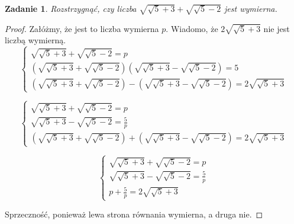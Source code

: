 \documentclass{article}
\newtheorem{problem}{Zadanie}
\begin{document}
\begin{problem}
    Rozstrzygnąć, czy liczba $\sqrt{\sqrt{5} + 3} + \sqrt{\sqrt{5} - 2}$
    jest wymierna.
\end{problem}
\begin{proof}
    Załóżmy, że jest to liczba wymierna $p$.
    Wiadomo, że $2 \sqrt{\sqrt{5} + 3}$ nie jest liczbą wymierną.
    $$
    \left\{ \begin{array}{ll}
        \sqrt{\sqrt{5} + 3} + \sqrt{\sqrt{5} - 2} = p\\
        (\sqrt{\sqrt{5} + 3} + \sqrt{\sqrt{5} - 2})(\sqrt{\sqrt{5} + 3}
         - \sqrt{\sqrt{5} - 2}) = 5\\
        (\sqrt{\sqrt{5} + 3} + \sqrt{\sqrt{5} - 2}) -
        (\sqrt{\sqrt{5} + 3} - \sqrt{\sqrt{5} - 2}) = 2 \sqrt{\sqrt{5} + 3}
    \end{array} \right.
    $$

    $$
    \left\{ \begin{array}{ll}
        \sqrt{\sqrt{5} + 3} + \sqrt{\sqrt{5} - 2} = p\\
        \sqrt{\sqrt{5} + 3} - \sqrt{\sqrt{5} - 2} = \frac{5}{p}\\
        (\sqrt{\sqrt{5} + 3} + \sqrt{\sqrt{5} - 2}) +
        (\sqrt{\sqrt{5} + 3} - \sqrt{\sqrt{5} - 2}) = 2 \sqrt{\sqrt{5} + 3}
    \end{array} \right.
    $$

    $$
    \left\{ \begin{array}{ll}
        \sqrt{\sqrt{5} + 3} + \sqrt{\sqrt{5} - 2} = p\\
        \sqrt{\sqrt{5} + 3} - \sqrt{\sqrt{5} - 2} = \frac{5}{p}\\
        p + \frac{5}{p} = 2 \sqrt{\sqrt{5} + 3}
    \end{array} \right.
    $$

    Sprzeczność, ponieważ lewa strona równania wymierna, a druga nie.
\end{proof}
\end{document}
